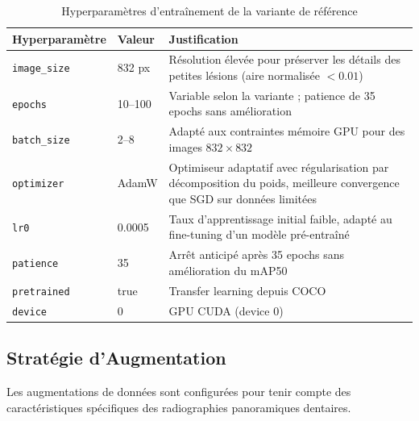 \documentclass{rapportENSIAS}
\begin{document}
\begin{table}[H]
\centering
\caption{Hyperparamètres d'entraînement de la variante de référence}
\label{tab:hyperparams}
\begin{tabular}{llp{7cm}}
\toprule
\textbf{Hyperparamètre} & \textbf{Valeur} & \textbf{Justification} \\
\midrule
\texttt{image\_size}  & 832 px
  & Résolution élevée pour préserver les détails des petites lésions
    (aire normalisée $< 0.01$) \\
\texttt{epochs}       & 10--100
  & Variable selon la variante ; patience de 35 epochs sans amélioration \\
\texttt{batch\_size}  & 2--8
  & Adapté aux contraintes mémoire GPU pour des images $832 \times 832$ \\
\texttt{optimizer}    & AdamW
  & Optimiseur adaptatif avec régularisation par décomposition du poids,
    meilleure convergence que SGD sur données limitées \\
\texttt{lr0}          & 0.0005
  & Taux d'apprentissage initial faible, adapté au fine-tuning d'un
    modèle pré-entraîné \\
\texttt{patience}     & 35
  & Arrêt anticipé après 35 epochs sans amélioration du mAP50 \\
\texttt{pretrained}   & true
  & Transfer learning depuis COCO \\
\texttt{device}       & 0
  & GPU CUDA (device 0) \\
\bottomrule
\end{tabular}
\end{table}

\subsection{Stratégie d'Augmentation}

Les augmentations de données sont configurées pour tenir compte des
caractéristiques spécifiques des radiographies panoramiques dentaires.
\end{document}

